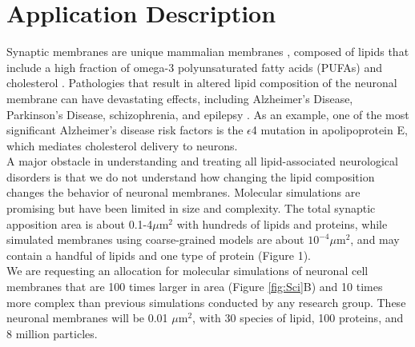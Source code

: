 \documentclass[oneside]{report}
\begin{document}
\section*{Application Description}

Synaptic membranes are unique mammalian membranes \cite{Bozek2015}, composed of lipids that include a high fraction of omega-3 polyunsaturated fatty acids (PUFAs) and cholesterol \cite{Isolated1969,Breckenridge1973,Ingolfsson2017}.  Pathologies that result in altered lipid composition of the neuronal membrane can have devastating effects, including Alzheimer's Disease, Parkinson's Disease, schizophrenia, and epilepsy \cite{MuralikrishnaAdibhatla}. As an example,  %
one of the most significant Alzheimer's disease risk factors is the $\epsilon$4 mutation in apolipoprotein E, which mediates cholesterol delivery to neurons.\cite{liu2013}\\

A major obstacle in understanding and treating all lipid-associated neurological disorders is that we do not understand how changing the lipid composition changes the behavior of neuronal membranes.  Molecular simulations are promising but have been limited in size and complexity.  The total synaptic apposition area is about 0.1-4$\mu$m$^{2}$\cite{yeow1991} with hundreds of lipids and proteins, while simulated membranes using coarse-grained models are about $10^{-4}\mu$m$^{2}$, and may contain a handful of lipids and one type of protein (Figure 1). \\

We are requesting an allocation for molecular simulations of neuronal cell membranes that are 100 times larger in area (Figure \ref{fig:Sci}B) and 10 times more complex than previous simulations conducted by any research group. These neuronal membranes will be 0.01 $\mu$m$^{2}$, with 30 species of lipid, 100 proteins, and 8 million particles. \\
\end{document}

